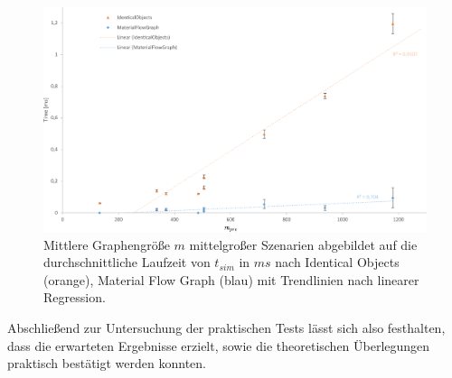 \begin{figure}
	\centering
	\includegraphics[width=1.00\textwidth]{Bilder/performance_per_comp.pdf} 
	\caption{Mittlere Graphengröße $m$ mittelgroßer Szenarien abgebildet auf die durchschnittliche Laufzeit von $t_{sim}$ in $ms$ nach Identical Objects (orange), Material Flow Graph (blau) mit Trendlinien nach linearer Regression.}
	\label{fig:time_comp}
\end{figure}

Abschließend zur Untersuchung der praktischen Tests lässt sich also festhalten, dass die erwarteten Ergebnisse erzielt, sowie die theoretischen Überlegungen praktisch bestätigt werden konnten.